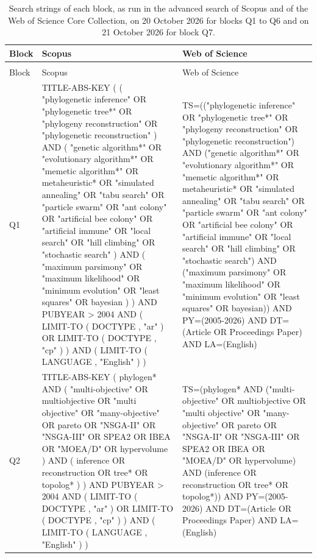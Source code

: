 {\scriptsize
\setlength{\LTcapwidth}{\linewidth}
\begin{longtable}{@{}>{\raggedright\arraybackslash}p{0.9cm}>{\raggedright\arraybackslash\ttfamily}p{\dimexpr(\linewidth-0.9cm-4\tabcolsep)/2\relax}>{\raggedright\arraybackslash\ttfamily}p{\dimexpr(\linewidth-0.9cm-4\tabcolsep)/2\relax}@{}}
\caption{Search strings of each block, as run in the advanced search of Scopus and of the Web of Science Core Collection, on 20 October 2026 for blocks Q1 to Q6 and on 21 October 2026 for block Q7.}\label{tab:queries}\\
\toprule
Block & \normalfont Scopus & \normalfont Web of Science\\
\midrule
\endfirsthead
\multicolumn{3}{l}{\emph{Table \ref{tab:queries} (continued)}}\\
\toprule
Block & \normalfont Scopus & \normalfont Web of Science\\
\midrule
\endhead
\bottomrule
\endfoot
Q1 & TITLE-ABS-KEY ( ( "phylogenetic inference" OR "phylogenetic tree*" OR "phylogeny reconstruction" OR "phylogenetic reconstruction" ) AND ( "genetic algorithm*" OR "evolutionary algorithm*" OR "memetic algorithm*" OR metaheuristic* OR "simulated annealing" OR "tabu search" OR "particle swarm" OR "ant colony" OR "artificial bee colony" OR "artificial immune" OR "local search" OR "hill climbing" OR "stochastic search" ) AND ( "maximum parsimony" OR "maximum likelihood" OR "minimum evolution" OR "least squares" OR bayesian ) ) AND PUBYEAR > 2004 AND ( LIMIT-TO ( DOCTYPE , "ar" ) OR LIMIT-TO ( DOCTYPE , "cp" ) ) AND ( LIMIT-TO ( LANGUAGE , "English" ) ) & TS=(("phylogenetic inference" OR "phylogenetic tree*" OR "phylogeny reconstruction" OR "phylogenetic reconstruction") AND ("genetic algorithm*" OR "evolutionary algorithm*" OR "memetic algorithm*" OR metaheuristic* OR "simulated annealing" OR "tabu search" OR "particle swarm" OR "ant colony" OR "artificial bee colony" OR "artificial immune" OR "local search" OR "hill climbing" OR "stochastic search") AND ("maximum parsimony" OR "maximum likelihood" OR "minimum evolution" OR "least squares" OR bayesian)) AND PY=(2005-2026) AND DT=(Article OR Proceedings Paper) AND LA=(English)\\
\addlinespace
Q2 & TITLE-ABS-KEY ( phylogen* AND ( "multi-objective" OR multiobjective OR "multi objective" OR "many-objective" OR pareto OR "NSGA-II" OR "NSGA-III" OR SPEA2 OR IBEA OR "MOEA/D" OR hypervolume ) AND ( inference OR reconstruction OR tree* OR topolog* ) ) AND PUBYEAR > 2004 AND ( LIMIT-TO ( DOCTYPE , "ar" ) OR LIMIT-TO ( DOCTYPE , "cp" ) ) AND ( LIMIT-TO ( LANGUAGE , "English" ) ) & TS=(phylogen* AND ("multi-objective" OR multiobjective OR "multi objective" OR "many-objective" OR pareto OR "NSGA-II" OR "NSGA-III" OR SPEA2 OR IBEA OR "MOEA/D" OR hypervolume) AND (inference OR reconstruction OR tree* OR topolog*)) AND PY=(2005-2026) AND DT=(Article OR Proceedings Paper) AND LA=(English)\\

\end{longtable}}

